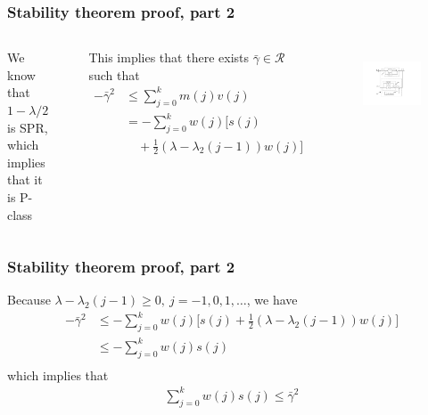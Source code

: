 \begin{frame}
    \frametitle{Stability theorem proof, part 2}

    \begin{columns}[c]
        We know that $1 - \lambda / 2$ is SPR, which implies that it is P-class

        $ \ $

        This implies that there exists $\bar{\gamma} \in \mathcal{R}$ such that
        \begin{align*}
            -\bar{\gamma}^2 & \leq \sum_{j=0}^k m(j) v(j) \\
            & = - \sum_{j=0}^k w(j) \Big[ s(j) \\
            & \quad + \frac{1}{2}(\lambda - \lambda_2(j-1)) w(j)\Big]
        \end{align*}


        \begin{figure}[h]
            \centering
            \includegraphics[width=\columnwidth]{figs_hyperstability}\\
        \end{figure}
    \end{columns}
\end{frame}

\begin{frame}
    \frametitle{Stability theorem proof, part 2}

    Because $\lambda - \lambda_2(j-1) \geq 0, \ j = -1,0,1,\ldots$, we have
    \begin{align*}
        -\bar{\gamma}^2 & \leq -\sum_{j=0}^k w(j) \Big[ s(j) + \frac{1}{2}(\lambda - \lambda_2(j-1)) w(j) \Big] \\
        & \leq -\sum_{j=0}^k w(j) s(j) \\
    \end{align*}
    \pause
    which implies that
    \begin{align*}
        \sum_{j=0}^k w(j) s(j) \leq \bar{\gamma}^2
    \end{align*}
\end{frame}

